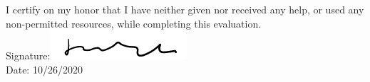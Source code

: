 \documentclass{article}
\begin{document}
\newpage
I certify on my honor that I have neither given nor received any help, or used any non-permitted resources, while completing this evaluation.\\
Signature:\includegraphics[width=2in]{signature.png}\\
Date: 10/26/2020
\end{document}
